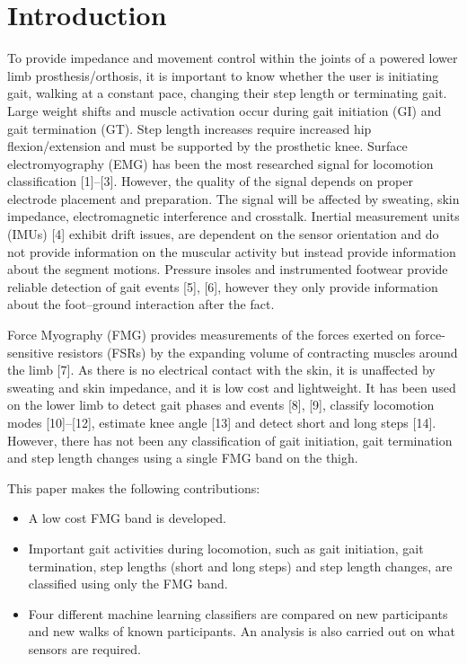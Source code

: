 \documentclass[conference]{IEEEtran}
\begin{document}
\section{Introduction}
To provide impedance and movement control within the joints of a powered lower limb prosthesis/orthosis, it is important to know whether the user is initiating gait, walking at a constant pace, changing their step length or terminating gait. Large weight shifts and muscle activation occur during gait initiation (GI) and gait termination (GT). Step length increases require increased hip flexion/extension and must be supported by the prosthetic knee. Surface electromyography (EMG) has been the most researched signal for locomotion classification [1]--[3]. However, the quality of the signal depends on proper electrode placement and preparation. The signal will be affected by sweating, skin impedance, electromagnetic interference and crosstalk. Inertial measurement units (IMUs) [4] exhibit drift issues, are dependent on the sensor orientation and do not provide information on the muscular activity but instead provide information about the segment motions. Pressure insoles and instrumented footwear provide reliable detection of gait events [5], [6], however they only provide information about the foot--ground interaction after the fact.

Force Myography (FMG) provides measurements of the forces exerted on force-sensitive resistors (FSRs) by the expanding volume of contracting muscles around the limb [7]. As there is no electrical contact with the skin, it is unaffected by sweating and skin impedance, and it is low cost and lightweight. It has been used on the lower limb to detect gait phases and events [8], [9], classify locomotion modes [10]--[12], estimate knee angle [13] and detect short and long steps [14]. However, there has not been any classification of gait initiation, gait termination and step length changes using a single FMG band on the thigh.

This paper makes the following contributions:

\begin{itemize}
\item A low cost FMG band is developed.
\item Important gait activities during locomotion, such as gait initiation, gait termination, step lengths (short and long steps) and step length changes, are classified using only the FMG band.
\item Four different machine learning classifiers are compared on new participants and new walks of known participants. An analysis is also carried out on what sensors are required.
\end{itemize}
\end{document}
